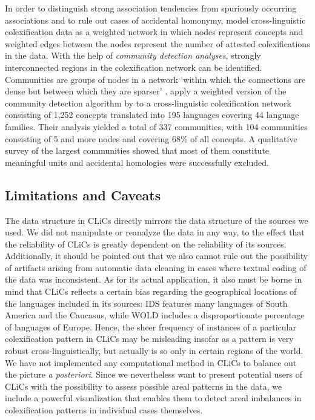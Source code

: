 In order to distinguish strong association tendencies from spuriously occurring associations and to
rule out cases of accidental homonymy,  model cross-linguistic colexification
data as a weighted network in which nodes represent concepts and weighted edges between the nodes
represent the number of attested colexifications in the data.  With the help of \emph{community
detection analyses}, strongly interconnected regions in the colexification network can be
identified. 
Communities are groups of nodes in a network
`within which the connections are dense but between which they are sparser' \cite{Newman2004}.
 apply a weighted version of the community detection algorithm by
 to a cross-linguistic colexification network consisting of 1,252 concepts
translated into 195 languages covering 44 language families. Their analysis yielded a total of 337
communities, with 104 communities consisting of 5 and more nodes and covering 68\% of all concepts.
A qualitative survey of the largest communities showed that most of them constitute meaningful
units and accidental homologies were successfully excluded.

\subsection{Limitations and Caveats} \label{caveats}

The data structure in CLiCs directly mirrors the data structure of the sources we used. We did not manipulate or
reanalyze the data in any way, to the effect that the reliability of CLiCs is greatly dependent on
the reliability of its sources. Additionally, it should be pointed out that we also cannot rule out the
possibility of artifacts arising from automatic data cleaning in cases where textual coding of the
data was inconsistent. As for its actual application, it also must be borne in mind that CLiCs
reflects a certain bias regarding the geographical locations of the languages included in its
sources: IDS features many languages of South America and the Caucasus, while WOLD includes a
disproportionate percentage of languages of Europe. Hence, the sheer frequency of instances of a
particular colexification pattern in CLiCs may be misleading insofar as a pattern is very robust
cross-linguistically, but actually is so only in certain regions of the world. We have not
implemented any computational method in CLiCs to balance out the picture \emph{a posteriori}. Since
we nevertheless want to present potential users of CLiCs with the possibility to assess possible
areal patterns in the data, we include a powerful visualization that enables them to detect areal
imbalances in colexification patterns in individual cases themselves.


